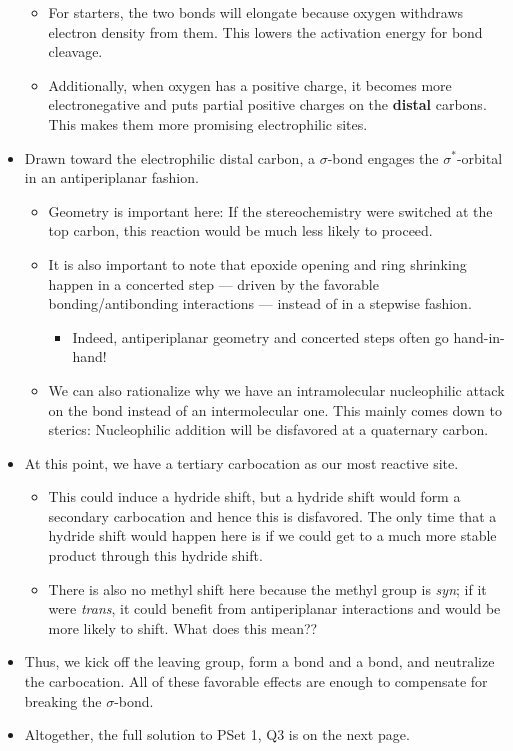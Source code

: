 \documentclass[../notes.tex]{subfiles}
\begin{document}
\begin{itemize}
\begin{itemize}
        \item For starters, the two  bonds will elongate because oxygen withdraws electron density from them. This lowers the activation energy for  bond cleavage.
        \item Additionally, when oxygen has a positive charge, it becomes more electronegative and puts partial positive charges on the \textbf{distal} carbons. This makes them more promising electrophilic sites.
    \end{itemize}
    \item Drawn toward the electrophilic distal carbon, a  $\sigma$-bond engages the  $\sigma^*$-orbital in an antiperiplanar fashion.
    \begin{itemize}
        \item Geometry is important here: If the stereochemistry were switched at the top carbon, this reaction would be much less likely to proceed.
        \item It is also important to note that epoxide opening and ring shrinking happen in a concerted step --- driven by the favorable bonding/antibonding interactions --- instead of in a stepwise fashion.
        \begin{itemize}
            \item Indeed, antiperiplanar geometry and concerted steps often go hand-in-hand!
        \end{itemize}
        \item We can also rationalize why we have an intramolecular nucleophilic attack on the  bond instead of an intermolecular one. This mainly comes down to sterics: Nucleophilic addition will be disfavored at a quaternary carbon.
    \end{itemize}
    \item At this point, we have a tertiary carbocation as our most reactive site.
    \begin{itemize}
        \item This could induce a hydride shift, but a hydride shift would form a secondary carbocation and hence this is disfavored. The only time that a hydride shift would happen here is if we could get to a much more stable product through this hydride shift.
        \item There is also no methyl shift here because the methyl group is \emph{syn}; if it were \emph{trans}, it could benefit from antiperiplanar interactions and would be more likely to shift. What does this mean??
    \end{itemize}
    \item Thus, we kick off the leaving group, form a  bond and a  bond, and neutralize the carbocation. All of these favorable effects are enough to compensate for breaking the  $\sigma$-bond.
    \item Altogether, the full solution to PSet 1, Q3 is on the next page.
    
\end{itemize}
\end{document}
